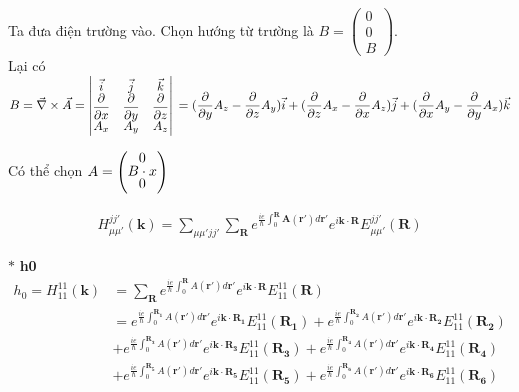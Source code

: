 \documentclass{article}
\begin{document}
\clearpage

Ta đưa điện trường vào. Chọn hướng từ trường là $\renewcommand{\arraystretch}{0.7} B = \begin{pmatrix} 0  \\ 0  \\ B  \end{pmatrix}$. \\
\noindent Lại có $B = \vec{\nabla} \times \vec{A} =
    \begin{vmatrix}
        \vec{i}                      & \vec{j}                      & \vec{k}                      \\
        \dfrac{\partial}{\partial x} & \dfrac{\partial}{\partial y} & \dfrac{\partial}{\partial z} \\
        A_x                          & A_y                          & A_z
    \end{vmatrix}\\
    = (\dfrac{\partial}{\partial y}A_z - \dfrac{\partial}{\partial z}A_y)\vec{i} + (\dfrac{\partial}{\partial z}A_x - \dfrac{\partial}{\partial x}A_z)\vec{j} + (\dfrac{\partial}{\partial x}A_y - \dfrac{\partial}{\partial y}A_x)\vec{k}$

\noindent Có thể chọn $A = \renewcommand{\arraystretch}{0.7} \begin{pmatrix} 0  \\ B\cdot x  \\ 0  \end{pmatrix}$

\begin{align}
    H_{\mu \mu'}^{jj'}(\textbf{k}) = \sum_{\mu\mu' jj'} \sum_{\textbf{R}} e^{\frac{ie}{\hbar}\int_{0}^{\textbf{R}} \textbf{A}(\mathbf{r'})d\mathbf{r'} } e^{i \mathbf{k}\cdot\textbf{R}} E_{\mu\mu'}^{jj'}(\textbf{R}) \nonumber
\end{align}

\noindent $\ast$ \textbf{h0}
\begin{align}
    h_0 = H_{11}^{11}(\textbf{k}) & = \sum_{\textbf{R}} e^{\frac{ie}{\hbar}\int_{0}^{\mathbf{R}}A(\mathbf{r'})d\mathbf{r'}}e^{i\mathbf{k\cdot R}} E_{11}^{11}(\mathbf{R}) \nonumber                                                                                                               \\
                                  & = e^{\frac{ie}{\hbar}\int_{0}^{\mathbf{R_1}}A(\mathbf{r'})d\mathbf{r'}}e^{i\mathbf{k\cdot R_1}} E_{11}^{11}(\mathbf{R_1}) + e^{\frac{ie}{\hbar}\int_{0}^{\mathbf{R_2}}A(\mathbf{r'})d\mathbf{r'}}e^{i\mathbf{k\cdot R_2}} E_{11}^{11}(\mathbf{R_2}) \nonumber \\
                                  & + e^{\frac{ie}{\hbar}\int_{0}^{\mathbf{R_3}}A(\mathbf{r'})d\mathbf{r'}}e^{i\mathbf{k\cdot R_3}} E_{11}^{11}(\mathbf{R_3}) + e^{\frac{ie}{\hbar}\int_{0}^{\mathbf{R_4}}A(\mathbf{r'})d\mathbf{r'}}e^{i\mathbf{k\cdot R_4}} E_{11}^{11}(\mathbf{R_4}) \nonumber \\
                                  & + e^{\frac{ie}{\hbar}\int_{0}^{\mathbf{R_5}}A(\mathbf{r'})d\mathbf{r'}}e^{i\mathbf{k\cdot R_5}} E_{11}^{11}(\mathbf{R_5}) + e^{\frac{ie}{\hbar}\int_{0}^{\mathbf{R_6}}A(\mathbf{r'})d\mathbf{r'}}e^{i\mathbf{k\cdot R_6}} E_{11}^{11}(\mathbf{R_6}) \nonumber
\end{align}
\end{document}
